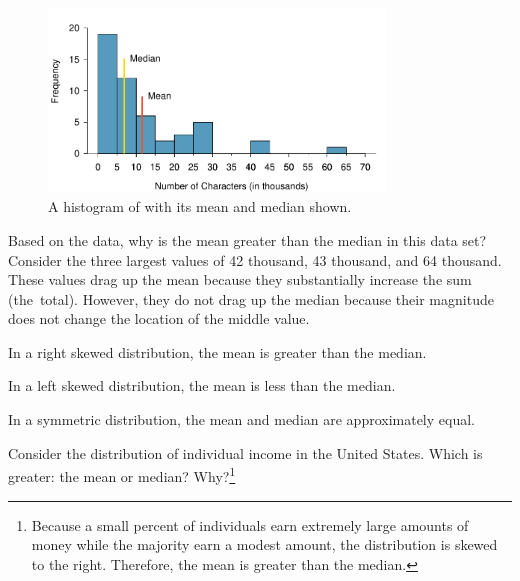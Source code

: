
\begin{figure}[h]
   \centering
   \includegraphics[width=0.8\textwidth]{ch_summarizing_data/figures/email50NumCharHist/email50NumCharHistWMeanMedian}
   \caption{A histogram of  with its mean and median shown.}
   \label{email50NumCharHistWMeanMedian}
\end{figure}

\begin{example}{Based on the data, why is the mean greater than the median in this data set?}
Consider the three largest values of 42 thousand, 43 thousand, and 64 thousand. These values drag up the mean because they substantially increase the sum (the~total). However, they do not drag up the median because their magnitude does not change the location of the middle value.
\end{example}


\begin{termBox}{
In a right skewed distribution, the mean is greater than the median.

In a left skewed distribution, the mean is less than the median.

In a symmetric distribution, the mean and median are approximately equal.}
\end{termBox}

\begin{exercise}Consider the distribution of individual income in the United States. Which is greater: the mean or median? Why?\footnote{Because a small percent of individuals earn extremely large amounts of money while the majority earn a modest amount, the distribution is skewed to the right. Therefore, the mean is greater than the median.}
\end{exercise}

